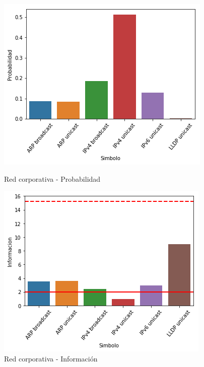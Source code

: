 \begin{figure}[H]
	\begin{minipage}{0.49\textwidth}
		\centering
		\includegraphics[width=\linewidth]{imagenes/despegar_barras_prob}
		\caption{Red corporativa - Probabilidad}
		\label{despe_barras_prob}
	\end{minipage}
	\begin{minipage}{0.49\textwidth}
		\centering
		\includegraphics[width=\linewidth]{imagenes/despegar_barras_info}
		\caption{Red corporativa - Información}
		\label{despe_barras_info}
	\end{minipage}
\end{figure}

